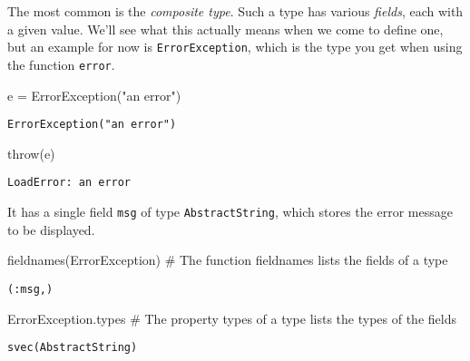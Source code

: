 \documentclass[
  letterpaper,
  DIV=11,
  numbers=noendperiod]{scrreprt}
\newenvironment{Shaded}{\begin{snugshade}}{\end{snugshade}}
\newcommand{\CommentTok}[1]{\textcolor[rgb]{0.37,0.37,0.37}{#1}}
\newcommand{\ConstantTok}[1]{\textcolor[rgb]{0.56,0.35,0.01}{#1}}
\newcommand{\DataTypeTok}[1]{\textcolor[rgb]{0.68,0.00,0.00}{#1}}
\newcommand{\FunctionTok}[1]{\textcolor[rgb]{0.28,0.35,0.67}{#1}}
\newcommand{\NormalTok}[1]{\textcolor[rgb]{0.00,0.23,0.31}{#1}}
\newcommand{\OperatorTok}[1]{\textcolor[rgb]{0.37,0.37,0.37}{#1}}
\newcommand{\StringTok}[1]{\textcolor[rgb]{0.13,0.47,0.30}{#1}}
\begin{document}
The most common is the \emph{composite type}. Such a type has various
\emph{fields}, each with a given value. We'll see what this actually
means when we come to define one, but an example for now is
\texttt{ErrorException}, which is the type you get when using the
function \texttt{error}.

\begin{Shaded}
\begin{Highlighting}[]
\ConstantTok{e} \OperatorTok{=} \FunctionTok{ErrorException}\NormalTok{(}\StringTok{"an error"}\NormalTok{)}
\end{Highlighting}
\end{Shaded}

\begin{verbatim}
ErrorException("an error")
\end{verbatim}

\begin{Shaded}
\begin{Highlighting}[]
\FunctionTok{throw}\NormalTok{(}\ConstantTok{e}\NormalTok{)}
\end{Highlighting}
\end{Shaded}

\begin{verbatim}
LoadError: an error
\end{verbatim}

It has a single field \texttt{msg} of type \texttt{AbstractString},
which stores the error message to be displayed.

\begin{Shaded}
\begin{Highlighting}[]
\FunctionTok{fieldnames}\NormalTok{(}\DataTypeTok{ErrorException}\NormalTok{) }\CommentTok{\# The function \textasciigrave{}fieldnames\textasciigrave{} lists the fields of a type}
\end{Highlighting}
\end{Shaded}

\begin{verbatim}
(:msg,)
\end{verbatim}

\begin{Shaded}
\begin{Highlighting}[]
\DataTypeTok{ErrorException}\NormalTok{.types }\CommentTok{\# The property \textasciigrave{}types\textasciigrave{} of a type lists the types of the fields}
\end{Highlighting}
\end{Shaded}

\begin{verbatim}
svec(AbstractString)
\end{verbatim}
\end{document}
